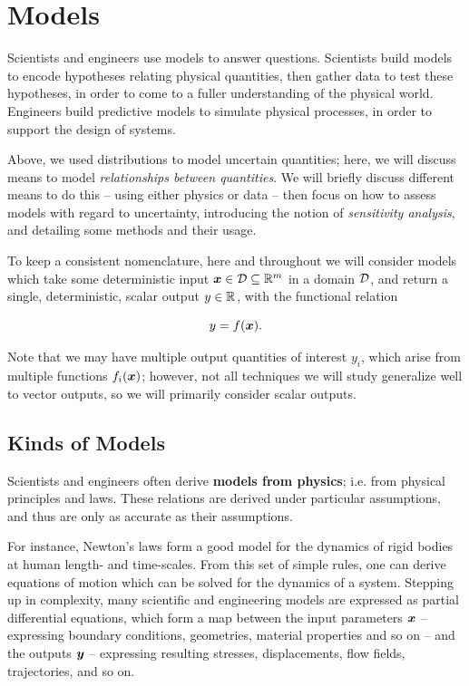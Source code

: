 \documentclass[../primer.tex]{subfiles}
\begin{document}
\section{Models} \label{sec:models}
Scientists and engineers use models to answer questions. Scientists build models
to encode hypotheses relating physical quantities, then gather data to test
these hypotheses, in order to come to a fuller understanding of the physical
world. Engineers build predictive models to simulate physical processes, in
order to support the design of systems.

Above, we used distributions to model uncertain quantities; here, we will
discuss means to model \emph{relationships between quantities}. We will briefly
discuss different means to do this -- using either physics or data -- then focus
on how to assess models with regard to uncertainty, introducing the notion of
\emph{sensitivity analysis}, and detailing some methods and their usage.

To keep a consistent nomenclature, here and throughout we will consider models
which take some deterministic input $\boldsymbol{x} \in \mathcal{D} \subseteq \mathbb{R}^{m}$ in a domain
$\mathcal{D}$, and return a single, deterministic, scalar output $y \in \mathbb{R}^{}$, with the
functional relation

\begin{equation}
  y = f(\boldsymbol{x}).
\end{equation}

\noindent Note that we may have multiple output quantities of interest $y_i$,
which arise from multiple functions $f_i(\boldsymbol{x})$; however, not all techniques we
will study generalize well to vector outputs, so we will primarily consider
scalar outputs.

\subsection{Kinds of Models}
Scientists and engineers often derive \textbf{models from physics}; i.e. from
physical principles and laws. These relations are derived under particular
assumptions, and thus are only as accurate as their assumptions.

For instance, Newton's laws form a good model for the dynamics of rigid bodies
at human length- and time-scales. From this set of simple rules, one can derive
equations of motion which can be solved for the dynamics of a system. Stepping
up in complexity, many scientific and engineering models are expressed as
partial differential equations, which form a map between the input parameters
$\boldsymbol{x}$ -- expressing boundary conditions, geometries, material properties and so
on -- and the outputs $\boldsymbol{y}$ -- expressing resulting stresses, displacements,
flow fields, trajectories, and so on.
\end{document}
